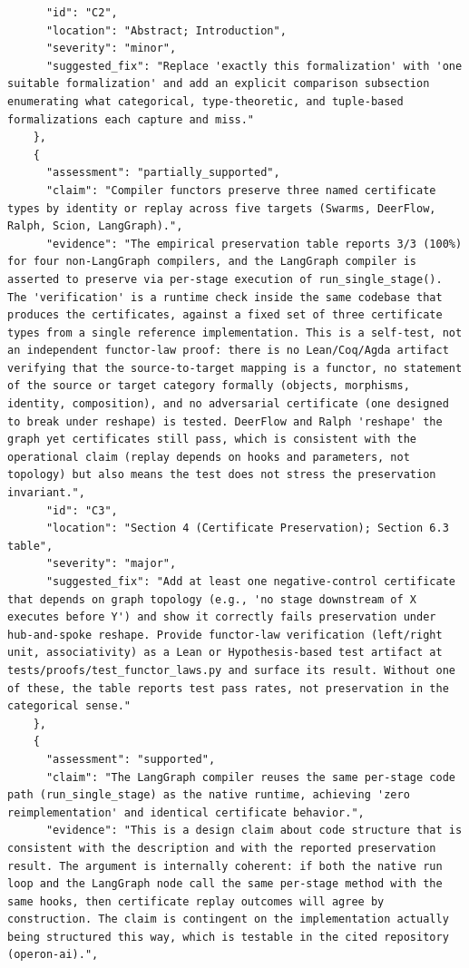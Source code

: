 \documentclass[11pt]{article}
\begin{document}
\begin{verbatim}
      "id": "C2",
      "location": "Abstract; Introduction",
      "severity": "minor",
      "suggested_fix": "Replace 'exactly this formalization' with 'one suitable formalization' and add an explicit comparison subsection enumerating what categorical, type-theoretic, and tuple-based formalizations each capture and miss."
    },
    {
      "assessment": "partially_supported",
      "claim": "Compiler functors preserve three named certificate types by identity or replay across five targets (Swarms, DeerFlow, Ralph, Scion, LangGraph).",
      "evidence": "The empirical preservation table reports 3/3 (100%) for four non-LangGraph compilers, and the LangGraph compiler is asserted to preserve via per-stage execution of run_single_stage(). The 'verification' is a runtime check inside the same codebase that produces the certificates, against a fixed set of three certificate types from a single reference implementation. This is a self-test, not an independent functor-law proof: there is no Lean/Coq/Agda artifact verifying that the source-to-target mapping is a functor, no statement of the source or target category formally (objects, morphisms, identity, composition), and no adversarial certificate (one designed to break under reshape) is tested. DeerFlow and Ralph 'reshape' the graph yet certificates still pass, which is consistent with the operational claim (replay depends on hooks and parameters, not topology) but also means the test does not stress the preservation invariant.",
      "id": "C3",
      "location": "Section 4 (Certificate Preservation); Section 6.3 table",
      "severity": "major",
      "suggested_fix": "Add at least one negative-control certificate that depends on graph topology (e.g., 'no stage downstream of X executes before Y') and show it correctly fails preservation under hub-and-spoke reshape. Provide functor-law verification (left/right unit, associativity) as a Lean or Hypothesis-based test artifact at tests/proofs/test_functor_laws.py and surface its result. Without one of these, the table reports test pass rates, not preservation in the categorical sense."
    },
    {
      "assessment": "supported",
      "claim": "The LangGraph compiler reuses the same per-stage code path (run_single_stage) as the native runtime, achieving 'zero reimplementation' and identical certificate behavior.",
      "evidence": "This is a design claim about code structure that is consistent with the description and with the reported preservation result. The argument is internally coherent: if both the native run loop and the LangGraph node call the same per-stage method with the same hooks, then certificate replay outcomes will agree by construction. The claim is contingent on the implementation actually being structured this way, which is testable in the cited repository (operon-ai).",

\end{verbatim}
\end{document}
